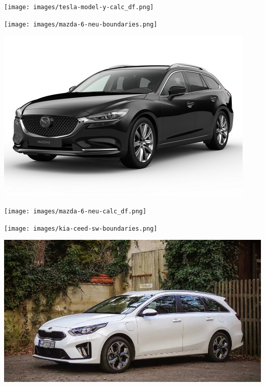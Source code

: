 \documentclass[landscape, DIV=99]{scrartcl}
\begin{document}
\pagebreak

\onecolumn
\null
\vfill 
\begin{center}
\texttt{[image: images/tesla-model-y-calc\_df.png]}
\end{center}
\vfill 
    
\twocolumn
\null
\vfill 
\texttt{[image: images/mazda-6-neu-boundaries.png]}
\vfill 

\pagebreak

\null
\vfill 
\includegraphics[width=\columnwidth]{cars/mazda-6-neu.png}
\vfill 

\pagebreak

\onecolumn
\null
\vfill 
\begin{center}
\texttt{[image: images/mazda-6-neu-calc\_df.png]}
\end{center}
\vfill 
    
\twocolumn
\null
\vfill 
\texttt{[image: images/kia-ceed-sw-boundaries.png]}
\vfill 

\pagebreak

\null
\vfill 
\includegraphics[width=\columnwidth]{cars/kia-ceed-sportswagon.png}
\vfill 
\end{document}
